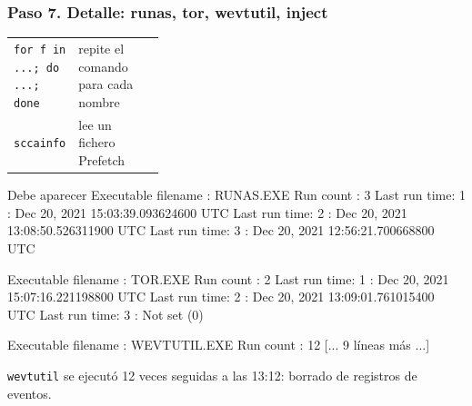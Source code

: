 \documentclass[11pt,a4paper]{article}
\begin{document}
\subsubsection*{Paso 7. Detalle: runas, tor, wevtutil, inject}
\begin{tcolorbox}[enhanced, breakable, colback=gray!3, colframe=gray!35, boxrule=0.3pt, arc=1pt, left=4pt, right=4pt, top=2pt, bottom=2pt, fonttitle=\sffamily\scriptsize\bfseries, coltitle=black!70, colbacktitle=gray!10, title={Qué hace cada parte}, attach title to upper, before skip=2pt, after skip=4pt, fontupper=\small]
\par{\renewcommand{\arraystretch}{1.12}\begin{tabularx}{\linewidth}{@{}>{\raggedright\arraybackslash}p{0.33\linewidth}>{\raggedright\arraybackslash}X@{}}
\texttt{for f in ...; do ...; done} & repite el comando para cada nombre \\
\texttt{sccainfo} & lee un fichero Prefetch \\
\end{tabularx}}
\end{tcolorbox}
\begin{salida}{Debe aparecer}
        Executable filename             : RUNAS.EXE
        Run count                       : 3
        Last run time: 1                : Dec 20, 2021 15:03:39.093624600 UTC
        Last run time: 2                : Dec 20, 2021 13:08:50.526311900 UTC
        Last run time: 3                : Dec 20, 2021 12:56:21.700668800 UTC

        Executable filename             : TOR.EXE
        Run count                       : 2
        Last run time: 1                : Dec 20, 2021 15:07:16.221198800 UTC
        Last run time: 2                : Dec 20, 2021 13:09:01.761015400 UTC
        Last run time: 3                : Not set (0)

        Executable filename             : WEVTUTIL.EXE
        Run count                       : 12
[... 9 líneas más ...]
\end{salida}
\begin{nota}\texttt{wevtutil} se ejecutó 12 veces seguidas a las 13:12: borrado de registros de eventos.\end{nota}
\end{document}
